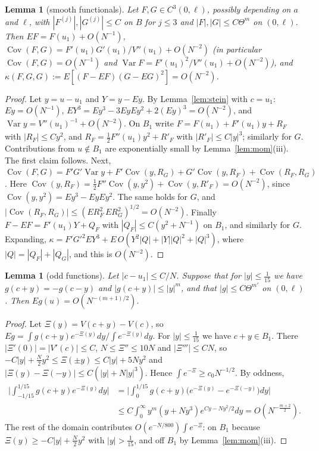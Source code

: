 \documentclass[11pt]{amsart}
\newtheorem{lemma}[theorem]{Lemma}
\theoremstyle{definition}
\begin{document}
\begin{lemma}[smooth functionals]\label{lem:func}
Let $F,G\in C^3(0,\ell)$, possibly depending on $a$ and $\ell$, with $|F^{(j)}|,|G^{(j)}|\le C$ on $B$ for $j\le3$ and $|F|,|G|\le C\Theta^m$ on $(0,\ell)$. Then
$EF=F(u_1)+O(N^{-1})$, $\operatorname{Cov}(F,G)=F'(u_1)G'(u_1)/V''(u_1)+O(N^{-2})$ (in particular $\operatorname{Cov}(F,G)=O(N^{-1})$ and
$\operatorname{Var}F=F'(u_1)^2/V''(u_1)+O(N^{-2})$), and $\kappa(F,G,G):=E[(F-EF)(G-EG)^2]=O(N^{-2})$.
\end{lemma}
\begin{proof}
Let $y=u-u_1$ and $Y=y-Ey$. By Lemma~\ref{lem:stein} with $c=u_1$: $Ey=O(N^{-1})$, $EY^3=Ey^3-3EyEy^2+2(Ey)^3=O(N^{-2})$, and
$\operatorname{Var}y=V''(u_1)^{-1}+O(N^{-2})$. On $B_1$ write $F=F(u_1)+F'(u_1)y+R_F$ with $|R_F|\le Cy^2$, and $R_F=\frac12F''(u_1)y^2+R'_F$ with
$|R'_F|\le C|y|^3$; similarly for $G$. Contributions from $u\notin B_1$ are exponentially small by Lemma~\ref{lem:mom}(iii). The first claim follows.
Next, $\operatorname{Cov}(F,G)=F'G'\operatorname{Var}y+F'\operatorname{Cov}(y,R_G)+G'\operatorname{Cov}(y,R_F)+\operatorname{Cov}(R_F,R_G)$. Here
$\operatorname{Cov}(y,R_F)=\frac12F''\operatorname{Cov}(y,y^2)+\operatorname{Cov}(y,R'_F)=O(N^{-2})$, since $\operatorname{Cov}(y,y^2)=Ey^3-EyEy^2$. The same holds
for $G$, and $|\operatorname{Cov}(R_F,R_G)|\le(ER_F^2\,ER_G^2)^{1/2}=O(N^{-2})$. Finally $F-EF=F'(u_1)Y+Q_F$ with $|Q_F|\le C(y^2+N^{-1})$ on $B_1$, and similarly for $G$. Expanding,
$\kappa=F'G'^2EY^3+E\,O(Y^2|Q|+|Y||Q|^2+|Q|^3)$, where $|Q|=|Q_F|+|Q_G|$, and this is $O(N^{-2})$.
\end{proof}

\begin{lemma}[odd functions]\label{lem:odd}
Let $|c-u_1|\le C/N$. Suppose that for $|y|\le\frac1{15}$ we have $g(c+y)=-g(c-y)$ and $|g(c+y)|\le|y|^m$, and that $|g|\le C\Theta^{m'}$ on $(0,\ell)$. Then $Eg(u)=O(N^{-(m+1)/2})$.
\end{lemma}
\begin{proof}
Let $\Xi(y)=V(c+y)-V(c)$, so $Eg=\int g(c+y)e^{-\Xi(y)}dy\big/\int e^{-\Xi(y)}dy$. For $|y|\le\frac1{15}$ we have $c+y\in B_1$. There
$|\Xi'(0)|=|V'(c)|\le C$, $N\le\Xi''\le10N$ and $|\Xi'''|\le CN$, so $-C|y|+\frac N2y^2\le\Xi(\pm y)\le C|y|+5Ny^2$ and $|\Xi(y)-\Xi(-y)|\le C(|y|+N|y|^3)$.
Hence $\int e^{-\Xi}\ge c_0N^{-1/2}$. By oddness,
\begin{align*}
\Big|\int_{-1/15}^{1/15}g(c+y)e^{-\Xi(y)}dy\Big|&=\Big|\int_0^{1/15}g(c+y)\big(e^{-\Xi(y)}-e^{-\Xi(-y)}\big)dy\Big|\\
&\le C\int_0^\infty y^m(y+Ny^3)e^{Cy-Ny^2/2}dy=O(N^{-\frac{m+2}2}).
\end{align*}
The rest of the domain contributes $O(e^{-N/800})\int e^{-\Xi}$: on $B_1$ because $\Xi(y)\ge-C|y|+\frac N2y^2$ with $|y|>\frac1{15}$, and off $B_1$ by Lemma~\ref{lem:mom}(iii).
\end{proof}
\end{document}
